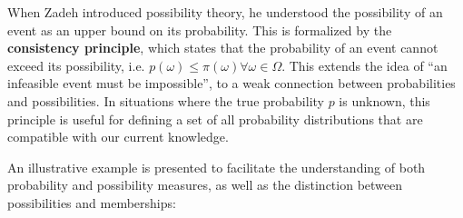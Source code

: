 When Zadeh introduced possibility theory, he understood the possibility of an event as an upper bound on its probability. This is formalized by the \textbf{consistency principle}, which states that the probability of an event cannot exceed its possibility, i.e. $p(\omega) \leq \pi(\omega) \forall \omega \in \Omega$. This extends the idea of ``an infeasible event must be impossible'', to a weak connection between probabilities and possibilities. In situations where the true probability $p$ is unknown, this principle is useful for defining a set of all probability distributions that are compatible with our current knowledge. 

An illustrative example is presented to facilitate the understanding of both probability and possibility measures, as well as the distinction between possibilities and memberships:


